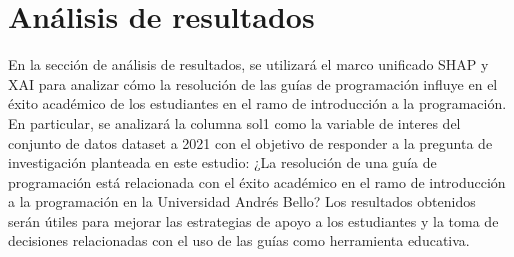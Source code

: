 \hypertarget{analisis_resultado}{%
    \section{Análisis de resultados}\label{Análisis de resultados}}

En la sección de análisis de resultados, se utilizará el marco unificado SHAP y XAI para analizar cómo la resolución de las guías de programación influye en el éxito académico de los estudiantes en el ramo de introducción a la programación. En particular, se analizará la columna sol1 como la variable de interes del conjunto de datos dataset a 2021 con el objetivo de responder a la pregunta de investigación planteada en este estudio: ¿La resolución de una guía de programación está relacionada con el éxito académico en el ramo de introducción a la programación en la Universidad Andrés Bello? Los resultados obtenidos serán útiles para mejorar las estrategias de apoyo a los estudiantes y la toma de decisiones relacionadas con el uso de las guías como herramienta educativa.








